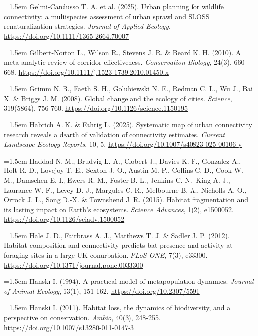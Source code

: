 \documentclass[a4paper,12pt]{report}
\begin{document}
\noindent\hangindent=1.5em Gelmi-Candusso T. A. et al. (2025). Urban planning for wildlife connectivity: a multispecies assessment of urban sprawl and SLOSS renaturalization strategies. \textit{Journal of Applied Ecology}. \url{https://doi.org/10.1111/1365-2664.70007}\par\medskip
\noindent\hangindent=1.5em Gilbert-Norton L., Wilson R., Stevens J. R. \& Beard K. H. (2010). A meta-analytic review of corridor effectiveness. \textit{Conservation Biology}, 24(3), 660-668. \url{https://doi.org/10.1111/j.1523-1739.2010.01450.x}\par\medskip
\noindent\hangindent=1.5em Grimm N. B., Faeth S. H., Golubiewski N. E., Redman C. L., Wu J., Bai X. \& Briggs J. M. (2008). Global change and the ecology of cities. \textit{Science}, 319(5864), 756-760. \url{https://doi.org/10.1126/science.1150195}\par\medskip
\noindent\hangindent=1.5em Habrich A. K. \& Fahrig L. (2025). Systematic map of urban connectivity research reveals a dearth of validation of connectivity estimates. \textit{Current Landscape Ecology Reports}, 10, 5. \url{https://doi.org/10.1007/s40823-025-00106-y}\par\medskip
\noindent\hangindent=1.5em Haddad N. M., Brudvig L. A., Clobert J., Davies K. F., Gonzalez A., Holt R. D., Lovejoy T. E., Sexton J. O., Austin M. P., Collins C. D., Cook W. M., Damschen E. I., Ewers R. M., Foster B. L., Jenkins C. N., King A. J., Laurance W. F., Levey D. J., Margules C. R., Melbourne B. A., Nicholls A. O., Orrock J. L., Song D.-X. \& Townshend J. R. (2015). Habitat fragmentation and its lasting impact on Earth's ecosystems. \textit{Science Advances}, 1(2), e1500052. \url{https://doi.org/10.1126/sciadv.1500052}\par\medskip
\noindent\hangindent=1.5em Hale J. D., Fairbrass A. J., Matthews T. J. \& Sadler J. P. (2012). Habitat composition and connectivity predicts bat presence and activity at foraging sites in a large UK conurbation. \textit{PLoS ONE}, 7(3), e33300. \url{https://doi.org/10.1371/journal.pone.0033300}\par\medskip
\noindent\hangindent=1.5em Hanski I. (1994). A practical model of metapopulation dynamics. \textit{Journal of Animal Ecology}, 63(1), 151-162. \url{https://doi.org/10.2307/5591}\par\medskip
\noindent\hangindent=1.5em Hanski I. (2011). Habitat loss, the dynamics of biodiversity, and a perspective on conservation. \textit{Ambio}, 40(3), 248-255. \url{https://doi.org/10.1007/s13280-011-0147-3}\par\medskip
\end{document}
